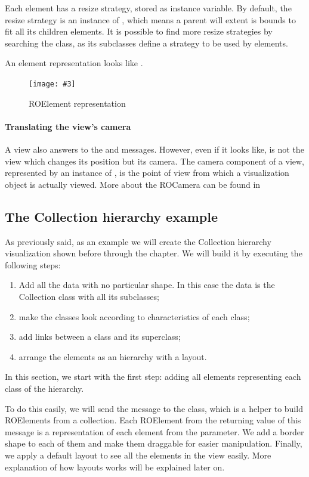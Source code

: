 \documentclass[a4paper,10pt,twoside]{book}
\newcommand{\fig}[4]{
		\begin{figure}[#1]
			\centering
			\texttt{[image: \#3]}
			\caption{\label{fig:#3}#4}
		\end{figure}}
\begin{document}
Each element has a resize strategy, stored as  instance variable.
By default, the resize strategy is an instance of , which means a parent will extent is bounds to fit all its children elements.
It is possible to find more resize strategies by searching the  class, as its subclasses define a strategy to be used by elements.

An element representation looks like .

\fig{H}{0.5}{ROElementModel}{ROElement representation}

\paragraph{Translating the view's camera}
A view also answers to the  and  messages. However, even if it looks like, is not the view which changes its position but its camera. The camera component of a view, represented by an instance of , is the point of view from which a visualization object is actually viewed. More about the ROCamera can be found in 

\subsection*{The Collection hierarchy example}

As previously said, as an example we will create the Collection hierarchy visualization shown before through the chapter. We will build it by executing the following steps:
\begin{enumerate}
\item Add all the data with no particular shape. In this case the data is the Collection class with all its subclasses;
\item make the classes look according to characteristics of each class;
\item add links between a class and its superclass;
\item arrange the elements as an hierarchy with a layout.
\end{enumerate}

In this section, we start with the first step: adding all elements representing each class of the hierarchy. 

To do this easily, we will send the  message to the  class, which is a helper to build ROElements from a collection. 
Each ROElement from the returning value of this message is a representation of each element from the parameter. 
We add a border shape to each of them and make them draggable for easier manipulation.
Finally, we apply a default layout to see all the elements in the view easily. 
More explanation of how layouts works will be explained later on. 
\end{document}
